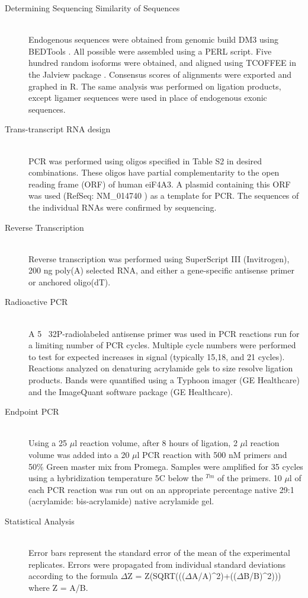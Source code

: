 \begin{description}
		\item[Determining Sequencing Similarity of \dscam{} Sequences] \hfill \\
		Endogenous \dscam{} sequences were obtained from genomic build DM3 using BEDTools \citep{Quinlan2010}. All possible \dscam{} were assembled using a PERL script. Five hundred random isoforms were obtained, and aligned using TCOFFEE \citep{Notredame2000} in the Jalview package \citep{Waterhouse2009}. Consensus scores of alignments were exported and graphed in R. The same analysis was performed on \dscam{} ligation products, except ligamer sequences were used in place of endogenous exonic sequences.
		
		\item[Trans-transcript RNA design] \hfill \\
		PCR was performed using oligos specified in Table S2 in desired combinations. These oligos have partial complementarity to the open reading frame (ORF) of human eiF4A3. A plasmid containing this ORF was used (RefSeq: NM_014740 ) as a template for PCR. The sequences of the individual RNAs were confirmed by sequencing. 

		\item[Reverse Transcription] \hfill \\
		Reverse transcription was performed using SuperScript III (Invitrogen), 200 ng poly(A) selected RNA, and either a gene-specific antisense primer or anchored oligo(dT).

		\item[Radioactive PCR] \hfill \\
		A 5\textprime~ 32P-radiolabeled antisense primer was used in PCR reactions run for a limiting number of PCR cycles. Multiple cycle numbers were performed to test for expected increases in signal (typically 15,18, and 21 cycles). Reactions analyzed on denaturing acrylamide gels to size resolve ligation products. Bands were quantified using a Typhoon imager (GE Healthcare) and the ImageQuant software package (GE Healthcare).

		\item[Endpoint PCR] \hfill \\
		Using a 25 $\mu$l reaction volume, after 8 hours of ligation, 2 $\mu$l reaction volume was added into a 20 $\mu$l PCR reaction with 500 nM primers and 50\% Green master mix from Promega. Samples were amplified for 35 cycles using a hybridization temperature 5\degree C below the $^{Tm}$ of the primers. 10 $\mu$l of each PCR reaction was run out on an appropriate percentage native 29:1 (acrylamide: bis-acrylamide) native acrylamide gel.

		\item[Statistical Analysis] \hfill \\
		Error bars represent the standard error of the mean of the experimental replicates. Errors were propagated from individual standard deviations according to the formula $\Delta$Z = Z(SQRT((($\Delta$A/A)^2)+(($\Delta$B/B)^2))) where Z = A/B.

		\end{description}

